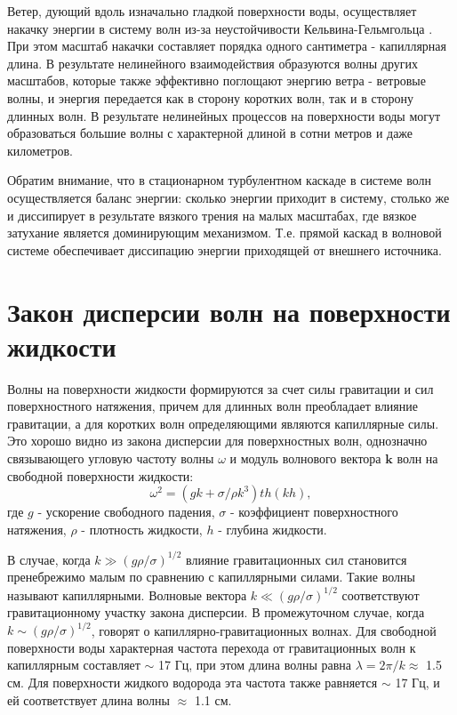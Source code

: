 Ветер, дующий вдоль изначально гладкой поверхности воды, осуществляет накачку энергии в систему волн из-за неустойчивости Кельвина-Гельмгольца \cite[c. 99]{NonLinearWaves}. При этом масштаб накачки составляет порядка одного сантиметра - капиллярная длина. В результате нелинейного взаимодействия образуются волны других масштабов, которые также эффективно поглощают энергию ветра - ветровые волны, и энергия передается как в сторону коротких волн, так и в сторону длинных волн. В результате нелинейных процессов на поверхности воды могут образоваться большие волны с характерной длиной в сотни метров и даже километров. 

Обратим внимание, что в стационарном турбулентном каскаде в системе волн осуществляется баланс энергии: сколько энергии приходит в систему, столько же и диссипирует в результате вязкого трения на малых масштабах, где вязкое затухание является доминирующим механизмом. Т.е. прямой каскад в волновой системе обеспечивает диссипацию энергии приходящей от внешнего источника. 


\section{Закон дисперсии волн на поверхности жидкости}%

Волны на поверхности жидкости формируются за счет силы гравитации и сил поверхностного натяжения, причем для длинных волн преобладает влияние гравитации, а для коротких волн определяющими являются капиллярные силы. Это хорошо видно из закона дисперсии для поверхностных волн, однозначно связывающего угловую частоту волны $\omega$ и модуль волнового вектора $\mathbf{k}$ волн на свободной поверхности жидкости:
\begin{equation}
 \label{eq:disper_dip}
\omega^2 = (gk + \sigma/\rho k^3)th(kh),
\end{equation}
где $g$ - ускорение свободного падения, $\sigma$ - коэффициент поверхностного натяжения, $\rho$ - плотность жидкости, $h$ - глубина жидкости.

В случае, когда $k \gg (g\rho/\sigma)^{1/2}$ влияние гравитационных сил становится пренебрежимо малым по сравнению с капиллярными силами. Такие волны называют капиллярными. Волновые вектора $k \ll (g\rho/\sigma)^{1/2}$ соответствуют гравитационному участку закона дисперсии. В промежуточном случае, когда $k \sim (g\rho/\sigma)^{1/2}$, говорят о капиллярно-гравитационных волнах. Для свободной поверхности воды характерная частота перехода от гравитационных волн к капиллярным составляет $\sim$ 17 Гц, при этом длина волны равна $\lambda = 2\pi/k \approx$ 1.5 см. Для поверхности жидкого водорода эта частота также равняется $\sim$ 17 Гц, и ей соответствует длина волны $\approx$ 1.1 см.



